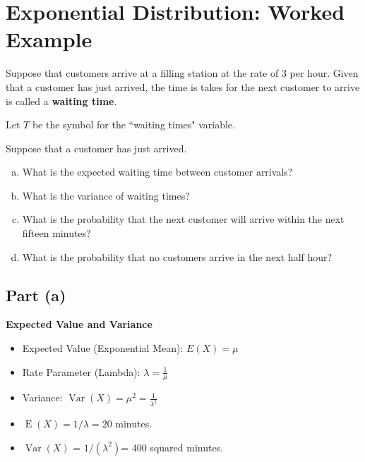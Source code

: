 \documentclass[a4paper,12pt]{article}
\begin{document}
\large 
\section*{Exponential Distribution: Worked Example}


\noindent Suppose that customers arrive at a filling station at the rate of 3 per hour. Given that a customer has just arrived, the time is takes for the next customer to arrive is called a \textbf{waiting time}. \\
\medskip 

\noindent Let $T$ be the symbol for the ``waiting times" variable. 

\noindent Suppose that a customer has just arrived.
\begin{enumerate}[(a)] \item What is the expected waiting time between customer arrivals? 
\item What is the variance of waiting times? 
	\item What is the probability that the next customer will arrive within the next fifteen minutes?
	\item What is the probability that no customers arrive in the next half hour?
\end{enumerate}

\newpage

\subsection*{Part (a)}

\noindent \textbf{Expected Value and Variance}

\begin{framed}
\begin{itemize}
    \item Expected Value (Exponential Mean): $E(X) = \mu$
    \item Rate Parameter (Lambda): $ \lambda  = \frac{1}{\mu} $
    \item Variance: $\operatorname{Var}(X) = \mu^2= \frac{1}{\lambda^2}$
\end{itemize}
\end{framed}

\begin{itemize}
    \item $\operatorname{E}(X) = 1/\lambda = 20$ minutes.
    \item $\operatorname{Var}(X)$ = $1/(\lambda^2)$= 400 squared minutes.
\end{itemize}
\end{document}
